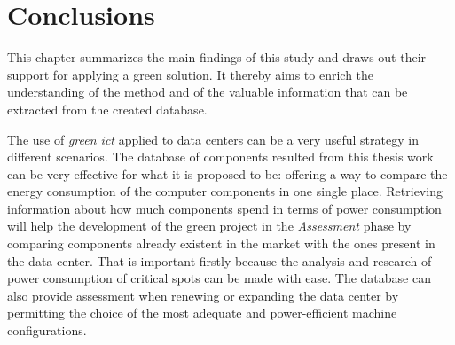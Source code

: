 

\chapter{Conclusions} \label{conclusion}





    This chapter summarizes the main findings of this study and draws out their support for applying a green solution. It thereby aims to enrich the understanding of the method and of the valuable information that can be extracted from the created database.
    
    The use of \emph{green ict} applied to data centers can be a very useful strategy in different scenarios. The database of components resulted from this thesis work can be very effective for what it is proposed to be: offering a way to compare the energy consumption of the computer components in one single place. Retrieving information about how much components spend in terms of power consumption will help the development of the green project in the \emph{Assessment} phase by comparing components already existent in the market with the ones present in the data center. That is important firstly because the analysis and research of power consumption of critical spots can be made with ease. The database can also provide assessment when renewing or expanding the data center by permitting the choice of the most adequate and power-efficient machine configurations.
    
